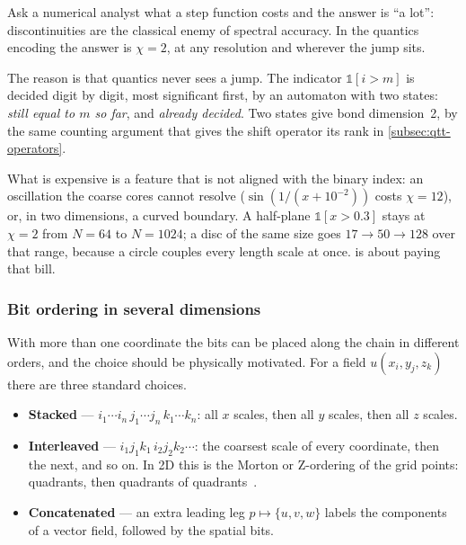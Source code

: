 \begin{remark}
  Ask a numerical analyst what a step function costs and the answer is
  \enquote{a lot}: discontinuities are the classical enemy of spectral
  accuracy. In the quantics encoding the answer is $\chi = 2$, at any
  resolution and wherever the jump sits.

  The reason is that quantics never sees a jump. The indicator
  $\mathbb{1}[i > m]$ is decided digit by digit, most significant first, by an
  automaton with two states: \emph{still equal to $m$ so far}, and
  \emph{already decided}. Two states give bond dimension~2, by the same
  counting argument that gives the shift operator its rank in
  \cref{subsec:qtt-operators}.

  What is expensive is a feature that is not aligned with the binary index: an
  oscillation the coarse cores cannot resolve ($\sin(1/(x+10^{-2}))$ costs
  $\chi=12$), or, in two dimensions, a curved boundary. A half-plane
  $\mathbb{1}[x > 0.3]$ stays at $\chi=2$ from $N=64$ to $N=1024$; a disc of the
  same size goes $17 \to 50 \to 128$ over that range, because a circle couples
  every length scale at once.  is about paying
  that bill.
\end{remark}

\subsubsection{Bit ordering in several dimensions}
\label{subsec:qtt-ordering}

With more than one coordinate the bits can be placed along the chain in
different orders, and the choice should be physically motivated. For a field
$u(x_i, y_j, z_k)$ there are three standard choices.
\begin{itemize}
  \item \textbf{Stacked} --- $i_1 \cdots i_{n}\, j_1 \cdots j_{n}\, k_1 \cdots
    k_{n}$: all $x$ scales, then all $y$ scales, then all $z$ scales.
  \item \textbf{Interleaved} --- $i_1 j_1 k_1\, i_2 j_2 k_2 \cdots$: the
    coarsest scale of every coordinate, then the next, and so on. In 2D this is
    the Morton or Z-ordering of the grid points: quadrants, then quadrants of
    quadrants~\cite{Latorre2005,Markeeva2020}.
  \item \textbf{Concatenated} --- an extra leading leg $p \mapsto \{u, v, w\}$
    labels the components of a vector field, followed by the spatial bits.
\end{itemize}

